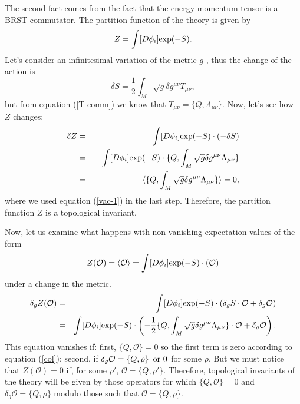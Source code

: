 \documentclass[12pt, onecolumn]{article}
\begin{document}
The second fact comes from the fact that the energy-momentum tensor is a BRST commutator. The partition function of the theory is given by
\begin{equation}
Z=\int [D\phi_i] {\rm exp}(-S). 
\end{equation} Let's consider an infinitesimal variation of the metric $g$ , thus the change of the action is 
\begin{equation}
\delta S=\frac{1}{2}\int_M\sqrt{g} \delta g^{\mu \nu} T_{\mu \nu},
\end{equation} but from equation (\ref{T-comm}) we know that $T_{\mu \nu} = \{Q,\Lambda_{\mu \nu}\}$. Now, let's see how $Z$ changes:
\begin{eqnarray}
\delta Z &=& \int [D\phi_i] {\rm exp}(-S)\cdot \left(-\delta S\right)\nonumber \\
&=& -\int [D\phi_i] {\rm exp}(-S)\cdot \{Q, \int_M\sqrt{g} \delta g^{\mu \nu} \Lambda_{\mu \nu}\} \nonumber \\
&=&- \langle \{Q, \int_M\sqrt{g} \delta g^{\mu \nu} \Lambda_{\mu \nu}\}\rangle = 0, \label{z-inv}
\end{eqnarray} where we used equation (\ref{vac-1}) in the last step. Therefore, the partition function $Z$ is a topological invariant. 

Now, let us examine what happens with non-vanishing expectation values of the form
\begin{equation}
 Z(\mathcal{O}) = \langle \mathcal{O} \rangle = \int [D\phi_i] {\rm exp}(-S)\cdot(\mathcal{O})
\end{equation} under a change in the metric.
\begin{eqnarray}
\delta_g  Z(\mathcal{O})& =& \int [D\phi_i] {\rm exp}(-S)\cdot(\delta_g S\cdot\mathcal{O}+\delta_g \mathcal{O})\nonumber \\
&=& \int [D\phi_i] {\rm exp}(-S)\cdot\left(-\frac{1}{2}\{Q, \int_M\sqrt{g} \delta g^{\mu \nu} \Lambda_{\mu \nu}\}\cdot \mathcal{O}+\delta_g \mathcal{O}\right).
\end{eqnarray} This equation vanishes if: first, $\{Q, \mathcal{O}\}=0$ so the first term is zero according to equation (\ref{col}); second, if $\delta_g \mathcal{O}=\{Q,\rho\} \,\,\,{\rm or}\,\,0$ for some $\rho$. But we must notice that $ Z(\mathcal{O}) =0$ if, for some $\rho'$, $\mathcal{O}=\{Q,\rho'\}$. Therefore, topological invariants of the theory will be given by those operators for which $\{Q, \mathcal{O}\}=0$ and $\delta_g \mathcal{O}=\{Q,\rho\}$  modulo those such that $\mathcal{O}=\{Q,\rho\}$.
\end{document}
